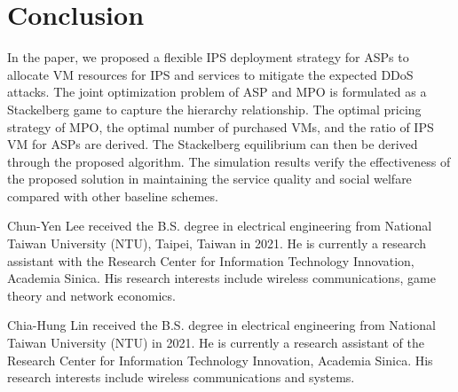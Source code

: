 \documentclass[10pt,journal, compsoc]{IEEEtran}
\begin{document}

\section{Conclusion} \label{sec:conclusion}
In the paper, we proposed a flexible IPS deployment strategy for ASPs to allocate VM resources for IPS and services to mitigate the expected DDoS attacks. The joint optimization problem of ASP and MPO is formulated as a Stackelberg game to capture the hierarchy relationship. The optimal pricing strategy of MPO, the optimal number of purchased VMs, and the ratio of IPS VM for ASPs are derived. The Stackelberg equilibrium can then be derived through the proposed algorithm. The simulation results verify the effectiveness of the proposed solution in maintaining the service quality and social welfare compared with other baseline schemes.




\begin{IEEEbiography}{Chun-Yen Lee}
received the B.S. degree in electrical engineering from National Taiwan University (NTU), Taipei, Taiwan in 2021. He is currently a research assistant with the Research Center for Information Technology Innovation, Academia Sinica. His research interests include wireless communications, game theory and network economics.
\end{IEEEbiography}


\begin{IEEEbiography}{Chia-Hung Lin}
received the B.S. degree in electrical engineering from National Taiwan University (NTU) in 2021. He is currently a research assistant of the Research Center for Information Technology Innovation, Academia Sinica. His research interests include wireless communications and systems.
\end{IEEEbiography}
\end{document}
